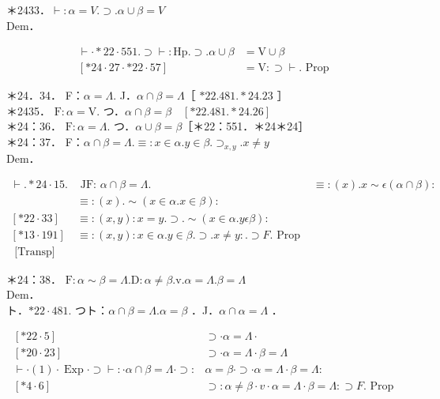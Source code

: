 \documentclass[10pt]{article}
\begin{document}
＊2433．$\vdash: \alpha=V . \supset . \alpha \cup \beta=V$\\
Dem．

$$
\begin{aligned}
\vdash \cdot * 22 \cdot 551 . \supset \vdash: \mathrm{Hp} . \supset . \alpha \cup \beta & =\mathrm{V} \cup \beta \\
{[* 24 \cdot 27 \cdot * 22 \cdot 57] } & =\mathrm{V}: \supset \vdash . \text { Prop }
\end{aligned}
$$

＊24．34． F：$\alpha=\Lambda$. J．$\alpha \cap \beta=\Lambda$［ $* 22.481 . * 24.23$ ］\\
＊2435． $\mathrm{F}: \alpha=\mathrm{V}$. つ．$\alpha \cap \beta=\beta \quad[* 22.481 . * 24.26]$\\
＊24：36． $\mathrm{F}: \alpha=\Lambda$. つ．$\alpha \cup \beta=\beta$［＊22：551．＊24＊24］\\
＊24：37． F：$\alpha \cap \beta=\Lambda . \equiv: x \in \alpha . y \in \beta . \supset_{x, y} . x \neq y$\\
Dem．

$$
\begin{array}{lrl}
\vdash . * 24 \cdot 15 . & \text { JF: } \alpha \cap \beta=\Lambda . & \equiv:(x) . x \sim \epsilon(\alpha \cap \beta): \\
& \equiv:(x) . \sim(x \in \alpha . x \in \beta): \\
{[* 22 \cdot 33]} & \equiv:(x, y): x=y . \supset . \sim(x \in \alpha . y \epsilon \beta): \\
{[* 13 \cdot 191]} & \equiv:(x, y): x \in \alpha . y \in \beta . \supset . x \neq y: . \supset F . \text { Prop } \\
\text { [Transp] } &
\end{array}
$$

＊24：38． $\mathrm{F}: \alpha \sim \beta=\Lambda . \mathrm{D}: \alpha \neq \beta . \mathrm{v} . \alpha=\Lambda . \beta=\Lambda$\\
Dem．\\
ト．$* 22 \cdot 481$. つト：$\alpha \cap \beta=\Lambda . \alpha=\beta$ ．J．$\alpha \cap \alpha=\Lambda$ ．

\[
\begin{array}{ll}
{[* 22 \cdot 5]} & \supset \cdot \alpha=\Lambda \cdot \\
{[* 20 \cdot 23]} & \supset \cdot \alpha=\Lambda \cdot \beta=\Lambda \\
\vdash \cdot(1) \cdot \operatorname{Exp} \cdot \supset \vdash: \cdot \alpha \cap \beta=\Lambda \cdot \supset: & \alpha=\beta \cdot \supset \cdot \alpha=\Lambda \cdot \beta=\Lambda:  \tag{1}\\
{[* 4 \cdot 6]} & \supset: \alpha \neq \beta \cdot v \cdot \alpha=\Lambda \cdot \beta=\Lambda: \supset F . \text { Prop }
\end{array}
\]
\end{document}
